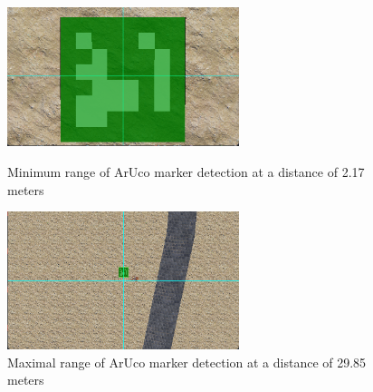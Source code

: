 \documentclass[a4paper]{jpconf}
\begin{document}
\begin{figure}[h]
    \centering
    \begin{minipage}{15pc}
        \includegraphics[width=16pc]{ArUco-at-2m.png}
        \caption{\label{label}Minimum range of ArUco marker detection at a distance of 2.17 meters}
    \end{minipage}\hspace{2pc}%
    \begin{minipage}{15pc}
        \includegraphics[width=16pc]{ArUco-at-29m.png}
        \caption{\label{label}Maximal range of ArUco marker detection at a distance of 29.85 meters}
    \end{minipage}
\end{figure}
\end{document}
